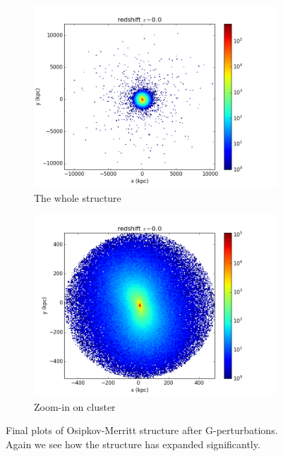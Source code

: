 \begin{figure}
\centering
\begin{subfigure}{.5\textwidth}
  \centering
  \includegraphics[width=1.0\linewidth]{img/Read_OMGOO_Final_1.png}
  \caption{The whole structure}
  \label{fig:sub1}
\end{subfigure}%
\begin{subfigure}{.5\textwidth}
  \centering
  \includegraphics[width=1.0\linewidth]{img/Read_OMGOO_Final_2.png}
  \caption{Zoom-in on cluster}
  \label{fig:sub2}
\end{subfigure}
\caption{Final plots of Osipkov-Merritt structure after G-perturbations. Again we see how the structure has expanded significantly. }
\label{fig:test}
\end{figure}

